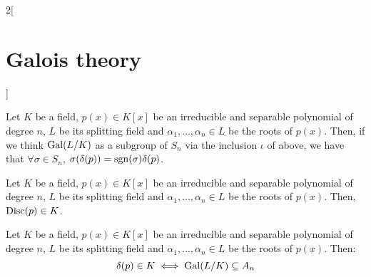 \documentclass[../../../main.tex]{subfiles}
\begin{document}
\begin{multicols}{2}[\section{Galois theory}]
\begin{lemma}
    Let $K$ be a field, $p(x)\in K[x]$ be an irreducible and separable polynomial of degree $n$, $L$ be its splitting field and $\alpha_1,\ldots,\alpha_n\in L$ be the roots of $p(x)$. Then, if we think $\Gal(\quot{L}{K})$ as a subgroup of $S_n$ via the inclusion $\iota$ of above, we have that $\forall \sigma\in S_n$, $\sigma(\delta(p))=\operatorname{sgn}(\sigma)\delta(p)$.
  \end{lemma}
  \begin{corollary}
    Let $K$ be a field, $p(x)\in K[x]$ be an irreducible and separable polynomial of degree $n$, $L$ be its splitting field and $\alpha_1,\ldots,\alpha_n\in L$ be the roots of $p(x)$. Then, $\operatorname{Disc}(p)\in K$.
  \end{corollary}
  \begin{corollary}
    Let $K$ be a field, $p(x)\in K[x]$ be an irreducible and separable polynomial of degree $n$, $L$ be its splitting field and $\alpha_1,\ldots,\alpha_n\in L$ be the roots of $p(x)$. Then: $$\delta(p)\in K\iff \operatorname{Gal}(L/K)\subseteq A_n$$
  \end{corollary}

\end{multicols}
\end{document}
